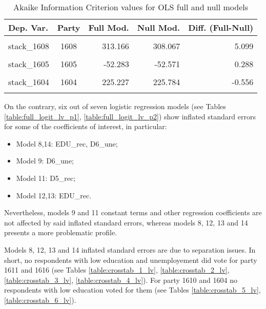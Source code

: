 \documentclass[
]{article}
\providecommand{\tightlist}{%
  \setlength{\itemsep}{0pt}\setlength{\parskip}{0pt}}
\begin{document}
\begin{table}[!h]

\caption{\label{tab:unnamed-chunk-102}Akaike Information Criterion values for OLS full and null models 
        \label{table:ols_aic_lv}}
\centering
\begin{tabular}[t]{lcrrr}
\toprule
Dep. Var. & Party & Full Mod. & Null Mod. & Diff. (Full-Null)\\
\midrule
\cellcolor{gray!6}{stack\_1611} & \cellcolor{gray!6}{1611} & \cellcolor{gray!6}{417.189} & \cellcolor{gray!6}{427.783} & \cellcolor{gray!6}{-10.593}\\
stack\_1608 & 1608 & 313.166 & 308.067 & 5.099\\
\cellcolor{gray!6}{stack\_1609} & \cellcolor{gray!6}{1609} & \cellcolor{gray!6}{298.365} & \cellcolor{gray!6}{304.472} & \cellcolor{gray!6}{-6.107}\\
stack\_1605 & 1605 & -52.283 & -52.571 & 0.288\\
\cellcolor{gray!6}{stack\_1610} & \cellcolor{gray!6}{1610} & \cellcolor{gray!6}{610.902} & \cellcolor{gray!6}{638.014} & \cellcolor{gray!6}{-27.112}\\
\addlinespace
stack\_1604 & 1604 & 225.227 & 225.784 & -0.556\\
\cellcolor{gray!6}{stack\_1616} & \cellcolor{gray!6}{1616} & \cellcolor{gray!6}{432.780} & \cellcolor{gray!6}{446.309} & \cellcolor{gray!6}{-13.529}\\
\bottomrule
\end{tabular}
\end{table}

On the contrary, six out of seven logistic regression models (see Tables \ref{table:full_logit_lv_p1},
\ref{table:full_logit_lv_p2}) show inflated standard errors for some of the coefficients of interest,
in particular:

\begin{itemize}
\tightlist
\item
  Model 8,14: EDU\_rec, D6\_une;
\item
  Model 9: D6\_une;
\item
  Model 11: D5\_rec;
\item
  Model 12,13: EDU\_rec.
\end{itemize}

Nevertheless, models 9 and 11 constant terms and other regression coefficients are not affected by said
inflated standard errors, whereas models 8, 12, 13 and 14 presents a more problematic profile.

Models 8, 12, 13 and 14 inflated standard errors are due to separation issues. In short, no respondents with low
education and unemployement did vote for party 1611 and 1616 (see Tables \ref{table:crosstab_1_lv},
\ref{table:crosstab_2_lv}, \ref{table:crosstab_3_lv}, \ref{table:crosstab_4_lv}). For party 1610 and 1604
no respondents with low education voted for them (see Tables \ref{table:crosstab_5_lv}, \ref{table:crosstab_6_lv}).
\end{document}
